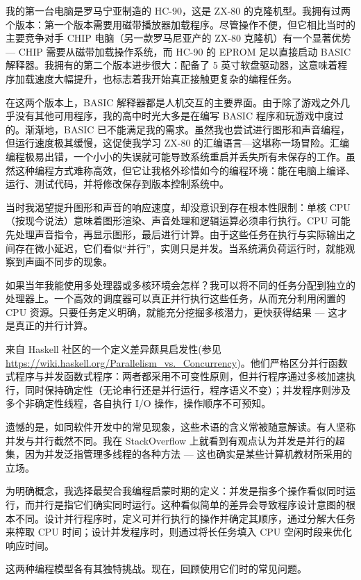 我的第一台电脑是罗马宁亚制造的 HC-90，这是 ZX-80 的克隆机型。我拥有过两个版本：第一个版本需要用磁带播放器加载程序。尽管操作不便，但它相比当时的主要竞争对手 CHIP 电脑（另一款罗马尼亚产的 ZX-80 克隆机）有一个显著优势--- CHIP 需要从磁带加载操作系统，而 HC-90 的 EPROM 足以直接启动 BASIC 解释器。我拥有的第二个版本进步很大：配备了 5 英寸软盘驱动器，这意味着程序加载速度大幅提升，也标志着我开始真正接触更复杂的编程任务。

在这两个版本上，BASIC 解释器都是人机交互的主要界面。由于除了游戏之外几乎没有其他可用程序，我的高中时光大多是在编写 BASIC 程序和玩游戏中度过的。渐渐地，BASIC 已不能满足我的需求。虽然我也尝试进行图形和声音编程，但运行速度极其缓慢，这促使我学习 ZX-80 的汇编语言---这堪称一场冒险。汇编编程极易出错，一个小小的失误就可能导致系统重启并丢失所有未保存的工作。虽然这种编程方式难称高效，但它让我格外珍惜如今的编程环境：能在电脑上编译、运行、测试代码，并将修改保存到版本控制系统中。

当时我渴望提升图形和声音的响应速度，却没意识到存在根本性限制：单核 CPU（按现今说法）意味着图形渲染、声音处理和逻辑运算必须串行执行。CPU 可能先处理声音指令，再显示图形，最后进行计算。由于这些任务在执行与实际输出之间存在微小延迟，它们看似“并行”，实则只是并发。当系统满负荷运行时，就能观察到声画不同步的现象。

如果当年我能使用多处理器或多核环境会怎样？我可以将不同的任务分配到独立的处理器上。一个高效的调度器可以真正并行执行这些任务，从而充分利用闲置的 CPU 资源。只要任务定义明确，就能充分挖掘多核潜力，更快获得结果 --- 这才是真正的并行计算。

来自 Haskell 社区的一个定义差异颇具启发性(参见\url{https://wiki.haskell.org/Parallelism_vs._Concurrency})。他们严格区分并行函数式程序与并发函数式程序：两者都采用不可变性原则，但并行程序通过多核加速执行，同时保持确定性（无论串行还是并行运行，程序语义不变）；并发程序则涉及多个非确定性线程，各自执行 I/O 操作，操作顺序不可预知。

遗憾的是，如同软件开发中的常见现象，这些术语的含义常被随意解读。有人坚称并发与并行截然不同。我在 StackOverflow 上就看到有观点认为并发是并行的超集，因为并发泛指管理多线程的各种方法 --- 这也确实是某些计算机教材所采用的立场。

为明确概念，我选择最契合我编程启蒙时期的定义：并发是指多个操作看似同时运行，而并行是指它们确实同时运行。这种看似简单的差异会导致程序设计意图的根本不同。设计并行程序时，定义可并行执行的操作并确定其顺序，通过分解大任务来榨取 CPU 时间；设计并发程序时，则通过将长任务填入 CPU 空闲时段来优化响应时间。

这两种编程模型各有其独特挑战。现在，回顾使用它们时的常见问题。